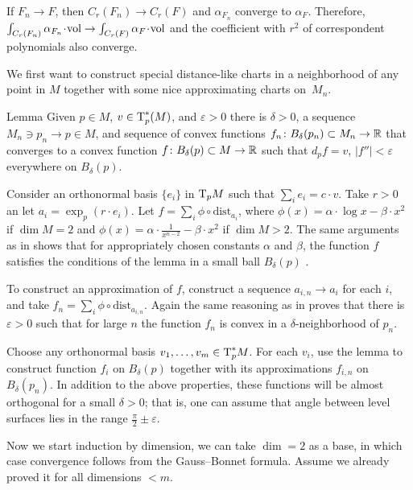 \documentclass{article}
\begin{document}
If $F_n\to F$, then $C_r(F_n)\to C_r(F)$
and $\alpha_{F_n}$ converge to $\alpha_{F}$.
Therefore, $\int_{C_r(F_n)}\alpha_{F_n}\cdot \vol\to\int_{C_r(F)}\alpha_F\cdot \vol$ and the coefficient with $r^2$ of correspondent polynomials also converge.
\qeds


 We first want to construct special
distance-like charts in a neighborhood of any point in $M$
together with some nice approximating charts on~$M_n$.


\begin{thm}{Lemma}\label{B.5} Given $p\in M$, $v\in \text{\rm T}_p^*(M)$, and $\varepsilon>0$ there is $\delta>0$,
a sequence $M_n\ni p_n\to p\in M$,
and sequence of convex functions $f_n\colon B_\delta(p_n)\subset M_n\to \mathbb{R}$ that converges to a convex function $f\colon B_\delta(p)\subset M\to\mathbb{R}$ such that $d_pf=v$, $|f''|<\varepsilon$ everywhere on $B_\delta(p)$.
\end{thm}


Consider an orthonormal basis $\{e_i\}$
in $\text{\rm T}_p M$ such that $\sum_i e_i=c\cdot v$. Take $r >0$ an let
$a_i=\exp_p (r\cdot e_i)$.
Let $f=\sum_i \phi\circ\text{dist}_{a_i}$,
where $\phi(x)=\alpha\cdot  \log x-\beta\cdot  x^2$ if $\dim M=2$ and
$\phi(x)=\alpha\cdot  \frac{1}{x^{n-2}}-\beta\cdot  x^2$ if $\dim M>2$.
The same arguments as in \cite[4.3]{PP} shows that for appropriately chosen constants $\alpha$ and $\beta$, the function $f$ satisfies the conditions
of the lemma in a small ball $B_\delta(p)$ .

To construct an approximation of $f$, construct a
sequence $a_{i,n}\to a_i$ for each $i$, and take $f_n=\sum_i
\phi\circ\text{dist}_{a_{i,n}}$. Again the same reasoning as in
\cite[4.3]{PP} proves that there is $\varepsilon>0$ such that for large $n$
the function $f_n$ is convex in a $\delta$-neighborhood of $p_n$.\qeds


Choose any orthonormal basis $v_1,\dots,v_m\in \text{\rm T}^*_p M$.
For each $v_i$, use the lemma to construct function $f_i$ on $B_\delta(p)$ together with its approximations
$f_{i,n}$ on $B_\delta(p_n)$.
In addition to the above properties, these functions will be almost orthogonal for a small $\delta>0$;
that is, one can assume that angle between level surfaces lies in the range $\tfrac\pi2\pm\varepsilon$.

Now we start induction by dimension, we can take $\dim =2$ as a base, in which case convergence follows from the Gauss--Bonnet formula.
Assume we already proved it for all dimensions $<m$.
\end{document}
